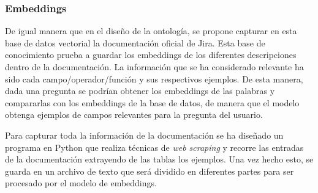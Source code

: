 \subsubsection{Embeddings}
De igual manera que en el diseño de la ontología, se propone capturar en esta base de datos vectorial la documentación oficial de Jira. Esta base de conocimiento prueba a guardar los embeddings de los diferentes descripciones dentro de la documentación. La información que se ha considerado relevante ha sido cada campo/operador/función y sus respectivos ejemplos. De esta manera, dada una pregunta se podrían obtener los embeddings de las palabras y compararlas con los embeddings de la base de datos, de manera que el modelo obtenga ejemplos de campos relevantes para la pregunta del usuario.

Para capturar toda la información de la documentación se ha diseñado un programa en Python que realiza técnicas de \textit{web scraping} y recorre las entradas de la documentación extrayendo de las tablas los ejemplos. Una vez hecho esto, se guarda en un archivo de texto que será dividido en diferentes partes para ser procesado por el modelo de embeddings.